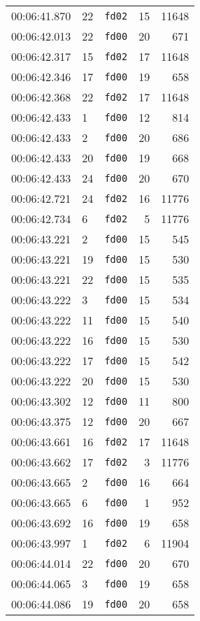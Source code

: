 \documentclass{article}
\begin{document}
\begin{longtable}{lllrr}
00:06:41.870 & 22 & \texttt{fd02} & 15 & 11648 \\
00:06:42.013 & 22 & \texttt{fd00} & 20 & 671 \\
00:06:42.317 & 15 & \texttt{fd02} & 17 & 11648 \\
00:06:42.346 & 17 & \texttt{fd00} & 19 & 658 \\
00:06:42.368 & 22 & \texttt{fd02} & 17 & 11648 \\
00:06:42.433 & 1 & \texttt{fd00} & 12 & 814 \\
00:06:42.433 & 2 & \texttt{fd00} & 20 & 686 \\
00:06:42.433 & 20 & \texttt{fd00} & 19 & 668 \\
00:06:42.433 & 24 & \texttt{fd00} & 20 & 670 \\
00:06:42.721 & 24 & \texttt{fd02} & 16 & 11776 \\
00:06:42.734 & 6 & \texttt{fd02} & 5 & 11776 \\
00:06:43.221 & 2 & \texttt{fd00} & 15 & 545 \\
00:06:43.221 & 19 & \texttt{fd00} & 15 & 530 \\
00:06:43.221 & 22 & \texttt{fd00} & 15 & 535 \\
00:06:43.222 & 3 & \texttt{fd00} & 15 & 534 \\
00:06:43.222 & 11 & \texttt{fd00} & 15 & 540 \\
00:06:43.222 & 16 & \texttt{fd00} & 15 & 530 \\
00:06:43.222 & 17 & \texttt{fd00} & 15 & 542 \\
00:06:43.222 & 20 & \texttt{fd00} & 15 & 530 \\
00:06:43.302 & 12 & \texttt{fd00} & 11 & 800 \\
00:06:43.375 & 12 & \texttt{fd00} & 20 & 667 \\
00:06:43.661 & 16 & \texttt{fd02} & 17 & 11648 \\
00:06:43.662 & 17 & \texttt{fd02} & 3 & 11776 \\
00:06:43.665 & 2 & \texttt{fd00} & 16 & 664 \\
00:06:43.665 & 6 & \texttt{fd00} & 1 & 952 \\
00:06:43.692 & 16 & \texttt{fd00} & 19 & 658 \\
00:06:43.997 & 1 & \texttt{fd02} & 6 & 11904 \\
00:06:44.014 & 22 & \texttt{fd00} & 20 & 670 \\
00:06:44.065 & 3 & \texttt{fd00} & 19 & 658 \\
00:06:44.086 & 19 & \texttt{fd00} & 20 & 658 \\

\end{longtable}
\end{document}
